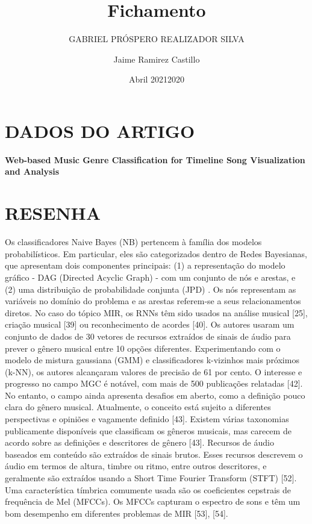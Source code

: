 \documentclass{article}
\title{Fichamento}
\author{GABRIEL PRÓSPERO REALIZADOR  SILVA}
\date{Abril 2021}
\begin{document}
\maketitle

\section{DADOS DO ARTIGO}
\textbf{Web-based Music Genre Classification for Timeline Song Visualization and Analysis \\}
\author{Jaime Ramirez Castillo \\}
\date{2020}

\section{RESENHA}
Os classificadores Naive Bayes (NB) pertencem à família dos modelos probabilísticos. 
Em particular, eles são categorizados dentro de Redes Bayesianas, que apresentam dois componentes principais: (1) a representação do modelo gráfico - DAG (Directed Acyclic Graph) - com um conjunto de nós e arestas, e (2) uma distribuição de probabilidade conjunta (JPD) . Os nós representam as variáveis no domínio do problema e as arestas referem-se a seus relacionamentos diretos.
No caso do tópico MIR, os RNNs têm sido usados ​​na análise musical [25], criação musical [39] ou reconhecimento de acordes [40].
Os autores usaram um conjunto de dados de 30 vetores de recursos extraídos de sinais de áudio para prever o gênero musical entre 10 opções diferentes. 
Experimentando com o modelo de mistura gaussiana (GMM) e classificadores k-vizinhos mais próximos (k-NN), os autores alcançaram valores de precisão de 61 por cento.
O interesse e progresso no campo MGC é notável, com mais de 500 publicações relatadas [42]. 
No entanto, o campo ainda apresenta desafios em aberto, como a definição pouco clara do gênero musical. 
Atualmente, o conceito está sujeito a diferentes perspectivas e opiniões e vagamente definido [43]. 
Existem várias taxonomias publicamente disponíveis que classificam os gêneros musicais, mas carecem de acordo sobre as definições e descritores de gênero [43].
Recursos de áudio baseados em conteúdo são extraídos de sinais brutos. 
Esses recursos descrevem o áudio em termos de altura, timbre ou ritmo, entre outros descritores, e geralmente são extraídos usando a Short Time Fourier Transform (STFT) [52].
Uma característica tímbrica comumente usada são os coeficientes cepstrais de frequência de Mel (MFCCs). 
Os MFCCs capturam o espectro de sons e têm um bom desempenho em diferentes problemas de MIR [53], [54]. 
\end{document}
